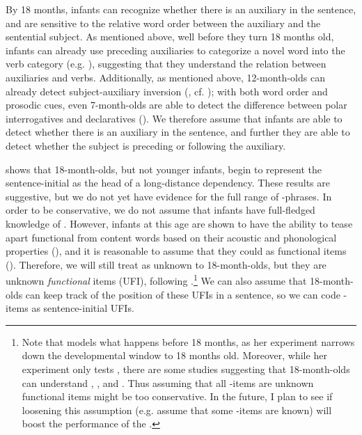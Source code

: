  By 18 months, infants can recognize whether there is an auxiliary in the sentence, and are sensitive to the relative word order between the auxiliary and the sentential subject. As mentioned above, well before they turn 18 months old, infants can already use preceding auxiliaries to categorize a novel word into the verb category (e.g. \cite{peterson2006aux, mintz2006verb}), suggesting that they understand the relation between auxiliaries and verbs. Additionally, as mentioned above, 12-month-olds can already detect subject-auxiliary inversion (\cite{geffenmintz2015wordorder}, cf. \cite{erreich1984,ambridge2006auxinvert}); with both word order and prosodic cues, even 7-month-olds are able to detect the difference between polar interrogatives and declaratives (\cite{geffenmintz2011}). We therefore assume that infants are able to detect whether there is an auxiliary in the sentence, and further they are able to detect whether the subject is preceding or following the auxiliary.

 \textcite{perkinslidz2021wh} shows that 18-month-olds, but not younger infants, begin to represent the sentence-initial  as the head of a long-distance dependency. These results are suggestive, but we do not yet have evidence for the full range of \twh-phrases. In order to be conservative, we do not assume that infants have full-fledged knowledge of \twh{}. However, infants at this age are shown to have the ability to tease apart functional from content words based on their acoustic and phonological properties (\cite{shi1999func,shi2014functional}), and it is reasonable to assume that they could   as functional items (\cite{perkins2019}). Therefore, we will still treat \twh{} as unknown to 18-month-olds, but they are unknown \emph{functional} items (UFI), following \textcite{perkins2019}.\footnote{Note that \textcite{perkins2019} models what happens before 18 months, as her experiment narrows down the developmental window to 18 months old. Moreover, while her experiment only tests , there are some studies suggesting that 18-month-olds can understand , , and  . Thus assuming that all \twh-items are unknown functional items might be too conservative. In the future, I plan to see if loosening this assumption (e.g. assume that some \twh-items are known) will boost the performance of the \dlearnerabbr{}.} We can also assume that 18-month-olds can keep track of the position of these UFIs in a sentence, so we can code \twh-items as sentence-initial UFIs. 

